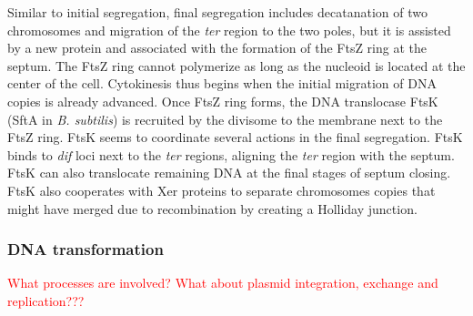 Similar to initial segregation, final segregation includes decatanation of two chromosomes and migration of the \textit{ter} region to the two poles, but it is assisted by a new protein and associated with the formation of the FtsZ ring at the septum. The FtsZ ring cannot polymerize as long as the nucleoid is located at the center of the cell. Cytokinesis thus begins when the initial migration of DNA copies is already advanced. Once FtsZ ring forms, the DNA translocase FtsK (SftA in \textit{B. subtilis}) is recruited by the divisome to the membrane next to the FtsZ ring. FtsK seems to coordinate several actions in the final segregation. FtsK binds to \textit{dif} loci next to the \textit{ter} regions, aligning the \textit{ter} region with the septum. FtsK can also translocate remaining DNA at the final stages of septum closing. FtsK also cooperates with Xer proteins to separate chromosomes copies that might have merged due to recombination by creating a Holliday junction.
 

\subsubsection{DNA transformation}

\textcolor{red}{What processes are involved?}
\textcolor{red}{What about plasmid integration, exchange and replication???}
